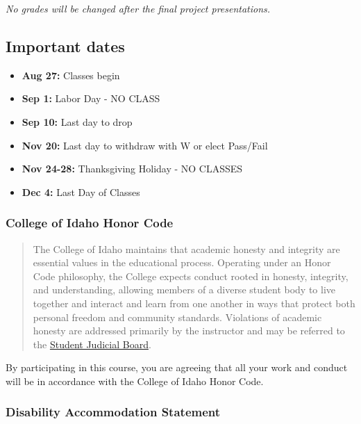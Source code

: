 \documentclass[
  letterpaper,
  DIV=11,
  numbers=noendperiod]{scrartcl}
\providecommand{\tightlist}{%
  \setlength{\itemsep}{0pt}\setlength{\parskip}{0pt}}
\begin{document}
\emph{No grades will be changed after the final project presentations.}

\subsection{Important dates}\label{important-dates}

\begin{itemize}
\tightlist
\item
  \textbf{Aug 27:} Classes begin
\item
  \textbf{Sep 1:} Labor Day - NO CLASS
\item
  \textbf{Sep 10:} Last day to drop
\item
  \textbf{Nov 20:} Last day to withdraw with W or elect Pass/Fail
\item
  \textbf{Nov 24-28:} Thanksgiving Holiday - NO CLASSES
\item
  \textbf{Dec 4:} Last Day of Classes
\end{itemize}

\subsubsection{College of Idaho Honor
Code}\label{college-of-idaho-honor-code}

\begin{quote}
The College of Idaho maintains that academic honesty and integrity are
essential values in the educational process. Operating under an Honor
Code philosophy, the College expects conduct rooted in honesty,
integrity, and understanding, allowing members of a diverse student body
to live together and interact and learn from one another in ways that
protect both personal freedom and community standards. Violations of
academic honesty are addressed primarily by the instructor and may be
referred to the
\href{https://collegeofidaho.smartcatalogiq.com/en/current/Undergraduate-Catalog/Policies-and-Procedures/Academic-Misconduct}{Student
Judicial Board}.
\end{quote}

By participating in this course, you are agreeing that all your work and
conduct will be in accordance with the College of Idaho Honor Code.

\subsubsection{Disability Accommodation
Statement}\label{disability-accommodation-statement}
\end{document}
